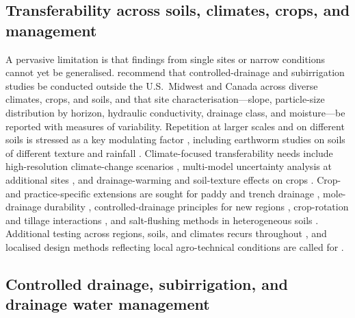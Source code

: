 \subsection{Transferability across soils, climates, crops, and management}

A pervasive limitation is that findings from single sites or narrow conditions
cannot yet be generalised. \textcite{Singh2022b} recommend that
controlled-drainage and subirrigation studies be conducted outside the U.S.\
Midwest and Canada across diverse climates, crops, and soils, and that site
characterisation---slope, particle-size distribution by horizon, hydraulic
conductivity, drainage class, and moisture---be reported with measures of
variability. Repetition at larger scales and on different soils is stressed as a
key modulating factor \parencite{Bilotta2008,Goeken2015}, including earthworm
studies on soils of different texture and rainfall \parencite{Nuutinen2001,Nuutinen2011}.
Climate-focused transferability needs include high-resolution climate-change
scenarios \parencite{Rasmussen2018}, multi-model uncertainty analysis at
additional sites \parencite{Jeantet2022}, and drainage-warming and soil-texture
effects on crops \parencite{Jin2008}. Crop- and practice-specific extensions are
sought for paddy and trench drainage \parencite{Rahimi2024,Jia2023}, mole-drainage
durability \parencite{JHA1995}, controlled-drainage principles for new regions
\parencite{Sojka2020}, crop-rotation and tillage interactions
\parencite{Ojeda2018}, and salt-flushing methods in heterogeneous soils
\parencite{Yu2018}. Additional testing across regions, soils, and climates recurs
throughout \parencite{Singh2020b,Malota2024,Salazar2008,Holbak2021}, and localised
design methods reflecting local agro-technical conditions are called for
\parencite{Tlapáková2017,Sinai2006,He2002}.

\subsection{Controlled drainage, subirrigation, and drainage water management}

